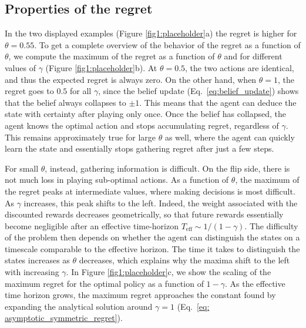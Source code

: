 \documentclass[aps,nofootinbib,groupaddress,superscriptaddress,reprint,amsmath,amssymb,graphicx,onecolumn,prx]{revtex4-2}
\begin{document}
\subsection{Properties of the regret} 
\noindent In the two displayed examples (Figure \ref{fig1:placeholder}a) the regret is higher for $\theta=0.55$. To get a complete overview of the behavior of the regret as a function of $\theta$, we compute the maximum of the regret as a function of $\theta$ and for different values of $\gamma$ (Figure \ref{fig1:placeholder}b). At $\theta = 0.5$, the two actions are identical, and thus the expected regret is always zero. On the other hand, when $\theta=1$, the regret goes to $0.5$ for all $\gamma$, since the belief update (Eq.~\eqref{eq:belief_update}) shows that the belief always collapses to $\pm1$. This means that the agent can deduce the state with certainty after playing only once. Once the belief has collapsed, the agent knows the optimal action and stops accumulating regret, regardless of $\gamma$. This remains approximately true for large $\theta$ as well, where the agent can quickly learn the state and essentially stops gathering regret after just a few steps.

For small $\theta$, instead, gathering information is difficult. On the flip side, there is not much loss in playing sub-optimal actions. As a function of $\theta$, the maximum of the regret peaks at intermediate values, where making decisions is most difficult. As $\gamma$ increases, this peak shifts to the left. Indeed, the weight associated with the discounted rewards decreases geometrically, so that future rewards essentially become negligible after an effective time-horizon $T_{\mathrm{eff}}\sim1/(1-\gamma)$. The difficulty of the problem then depends on whether the agent can distinguish the states on a timescale comparable to the effective horizon.
The time it takes to distinguish the states increases as $\theta$ decreases, which explains why the maxima shift to the left with increasing $\gamma$. In Figure \ref{fig1:placeholder}c, we show the scaling of the maximum regret for the optimal policy as a function of $1 - \gamma$. As the effective time horizon grows, the maximum regret approaches the constant found by expanding the analytical solution around $\gamma=1$ (Eq.~\eqref{eq: asymptotic_symmetric_regret}).
\end{document}
